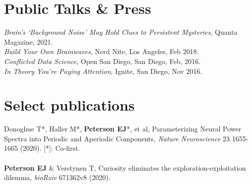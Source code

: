 \documentclass[margin,line]{res}
\begin{document}
\begin{resume}
\section{\sc Public Talks \& Press}
\emph{Brain's `Background Noise' May Hold Clues to Persistent Mysteries}, Quanta Magazine, 2021. \\
\emph{Build Your Own Brainwaves}, Nerd Nite, Los Angeles, Feb 2018. \\
\emph{Conflicted Data Science}, Open San Diego, San Diego, Feb, 2016. \\
\emph{In Theory You're Paying Attention}, Ignite, San Diego, Nov 2016. \\

    
\section{\sc Select publications}
Donoghue T*, Haller M*, \textbf{Peterson EJ}*, et al, Parameterizing Neural Power Spectra into Periodic and Aperiodic Components, \emph{Nature Neuroscience} 23 1655-1665 (2020). [*]: Co-first. 
\\ 
\vspace{-.3cm} 
\\
\textbf{Peterson EJ} \& Verstynen T, Curiosity eliminates the exploration-exploitation dilemma, \emph{bioRxiv} 671362v8 (2020). 

\end{resume}
\end{document}
